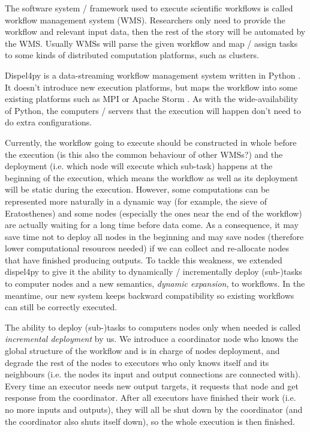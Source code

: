 \documentclass[•]{article}
\begin{document}
	The software system / framework used to execute scientific workflows is called workflow management system (WMS). Researchers only need to provide the workflow and relevant input data, then the rest of the story will be automated by the WMS. Usually WMSs will parse the given workflow and map / assign tasks to some kinds of distributed computation platforms, such as clusters.
	
	Dispel4py is a data-streaming workflow management system written in Python \cite{doi:10.1177/1094342016649766}. It doesn't introduce new execution platforms, but maps the workflow into some existing platforms such as MPI \cite{MPI_forum} or Apache Storm \cite{apache_storm}. As with the wide-availability of Python, the computers / servers that the execution will happen don't need to do extra configurations.
	
	Currently, the workflow going to execute should be constructed in whole before the execution (is this also the common behaviour of other WMSs?) and the deployment (i.e. which node will execute which sub-task) happens at the beginning of the execution, which means the workflow as well as its deployment will be static during the execution. However, some computations can be represented more naturally in a dynamic way (for example, the sieve of Eratosthenes) and some nodes (especially the ones near the end of the workflow) are actually waiting for a long time before data come. As a consequence, it may save time not to deploy all nodes in the beginning and may save nodes (therefore lower computational resources needed) if we can collect and re-allocate nodes that have finished producing outputs. To tackle this weakness, we extended dispel4py to give it the ability to dynamically / incrementally deploy (sub-)tasks to computer nodes and a new semantics, \textit{dynamic expansion}, to workflows. In the meantime, our new system keeps backward compatibility so existing workflows can still be correctly executed.
	
	The ability to deploy (sub-)tasks to computers nodes only when needed is called \textit{incremental deployment} by us. We introduce a coordinator node who knows the global structure of the workflow and is in charge of nodes deployment, and degrade the rest of the nodes to executors who only knows itself and its neighbours (i.e. the nodes its input and output connections are connected with). Every time an executor needs new output targets, it requests that node and get response from the coordinator. After all executors have finished their work (i.e. no more inputs and outputs), they will all be shut down by the coordinator (and the coordinator also shuts itself down), so the whole execution is then finished.
	
\end{document}
